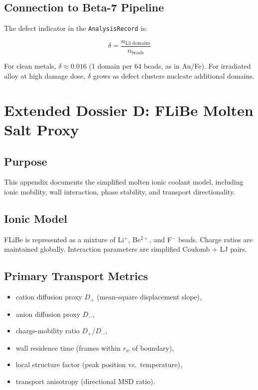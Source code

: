 \documentclass[12pt]{article}
\begin{document}
\subsection{Connection to Beta-7 Pipeline}

The defect indicator in the \texttt{AnalysisRecord} is:

\begin{equation}
	\delta = \frac{n_{\text{L3 domains}}}{n_{\text{beads}}}
\end{equation}

For clean metals, $\delta \approx 0.016$ (1 domain per 64 beads, as in Au/Fe).
For irradiated alloy at high damage dose, $\delta$ grows as defect clusters
nucleate additional domains.

\section{Extended Dossier D: FLiBe Molten Salt Proxy}
\label{app:flibe}

\subsection{Purpose}

This appendix documents the simplified molten ionic coolant model,
including ionic mobility, wall interaction, phase stability, and
transport directionality.

\subsection{Ionic Model}

FLiBe is represented as a mixture of Li$^+$, Be$^{2+}$, and F$^-$ beads.
Charge ratios are maintained globally.
Interaction parameters are simplified Coulomb + LJ pairs.

\subsection{Primary Transport Metrics}

\begin{itemize}[noitemsep]
	\item cation diffusion proxy $D_+$ (mean-square displacement slope),
	\item anion diffusion proxy $D_-$,
	\item charge-mobility ratio $D_+ / D_-$,
	\item wall residence time (frames within $r_w$ of boundary),
	\item local structure factor (peak position vs.\ temperature),
	\item transport anisotropy (directional MSD ratio).
\end{itemize}
\end{document}
